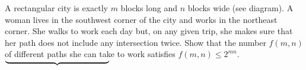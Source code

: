 A rectangular city is exactly $m$ blocks long and $n$ blocks wide (see diagram).  A woman lives in the southwest corner of the city and works in the northeast corner.  She walks to work each day but, on any given trip, she makes sure that her path does not include any intersection twice.  Show that the number $f(m,n)$ of different paths she can take to work satisfies $f(m,n) \le 2^{mn}$.$\underbrace{\hspace{4.4 cm}}$